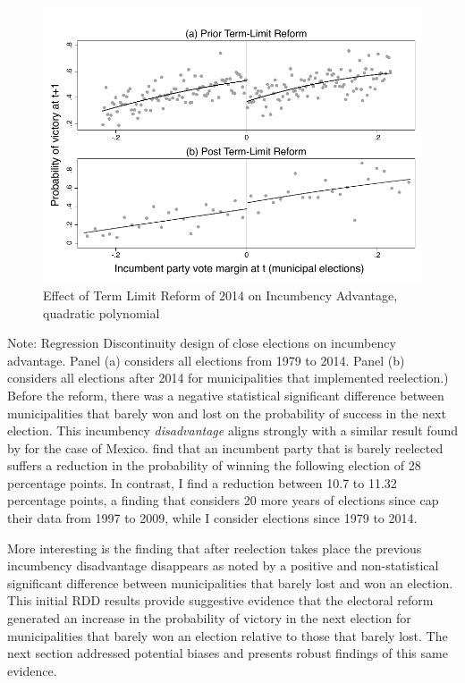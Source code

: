 \documentclass[12pt]{amsart}
\numberwithin{equation}{section}
\theoremstyle{definition}
\theoremstyle{definition}
\theoremstyle{definition}
\begin{document}
\begin{appendix}
\begin{figure}[H]
\centering
\caption{Effect of Term Limit Reform of 2014 on Incumbency Advantage, quadratic polynomial}
  \label{fig:incumbency_advantage} 

 \includegraphics[width=1\textwidth]{../Figures_incumbency/RDD_incumbency_pol2.pdf}
     \captionsetup{justification=centering}  
       
\end{figure} 
       Note: Regression Discontinuity design of close elections on incumbency advantage. Panel (a) considers all elections from 1979 to 2014. Panel (b) considers all elections after 2014 for municipalities that implemented reelection.) 
\\
       
Before the reform, there was a negative statistical significant difference between municipalities that barely won and lost on the probability of success in the next election. This incumbency \emph{disadvantage} aligns strongly with a similar result found by \citet{klasnja_titiunik_2017} for the case of Mexico. \citet{klasnja_titiunik_2017} find that an incumbent party that is barely reelected suffers a reduction in the probability of winning the following election of 28 percentage points. In contrast, I find a reduction between 10.7 to 11.32 percentage points, a finding that considers 20 more years of elections since \citet{klasnja_titiunik_2017} cap their data from 1997 to 2009, while I consider elections since 1979 to 2014. 

More interesting is the finding that after reelection takes place the previous incumbency disadvantage disappears as noted by a positive and non-statistical significant difference between municipalities that barely lost and won an election. This initial RDD results provide suggestive evidence that the electoral reform generated an increase in the probability of victory in the next election for municipalities that barely won an election relative to those that barely lost. The next section addressed potential biases and presents robust findings of this same evidence.  



\end{appendix}
\end{document}
